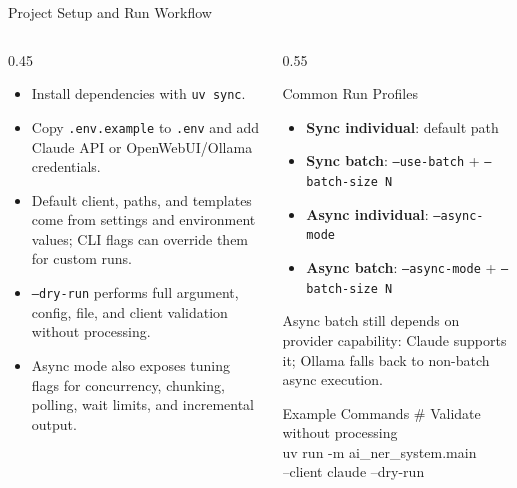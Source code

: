 \documentclass[
        11pt,
        compress,
        xcolor={dvipsnames}
    ]{beamer}
\begin{document}
\begin{frame}[shrink=4]{Project Setup and Run Workflow}
  \begin{columns}[T]
    \begin{column}{0.45\textwidth}
      \footnotesize
      \begin{itemize}\setlength{\itemsep}{0.3em}
        \item Install dependencies with \texttt{uv sync}.
        \item Copy \texttt{.env.example} to \texttt{.env} and add Claude API or OpenWebUI/Ollama credentials.
        \item Default client, paths, and templates come from settings and environment values; CLI flags can override them for custom runs.
        \item \texttt{--dry-run} performs full argument, config, file, and client validation without processing.
        \item Async mode also exposes tuning flags for concurrency, chunking, polling, wait limits, and incremental output.
      \end{itemize}
    \end{column}
    \begin{column}{0.55\textwidth}
      \begin{block}{Common Run Profiles}
        \scriptsize
        \begin{itemize}\setlength{\itemsep}{0.2em}
          \item \textbf{Sync individual}: default path
          \item \textbf{Sync batch}: \texttt{--use-batch} + \texttt{--batch-size N}
          \item \textbf{Async individual}: \texttt{--async-mode}
          \item \textbf{Async batch}: \texttt{--async-mode} + \texttt{--batch-size N}
        \end{itemize}
      \end{block}
      \scriptsize
      Async batch still depends on provider capability: Claude supports it; Ollama falls back to non-batch async execution.
      \begin{block}{Example Commands}
        \ttfamily\tiny
        \textrm{\# Validate without processing}\\
        uv run -m ai\_ner\_system.main\\
        \hspace*{1em}--client claude --dry-run\\[0.3em]

\end{block}
\end{column}
\end{columns}
\end{frame}
\end{document}
